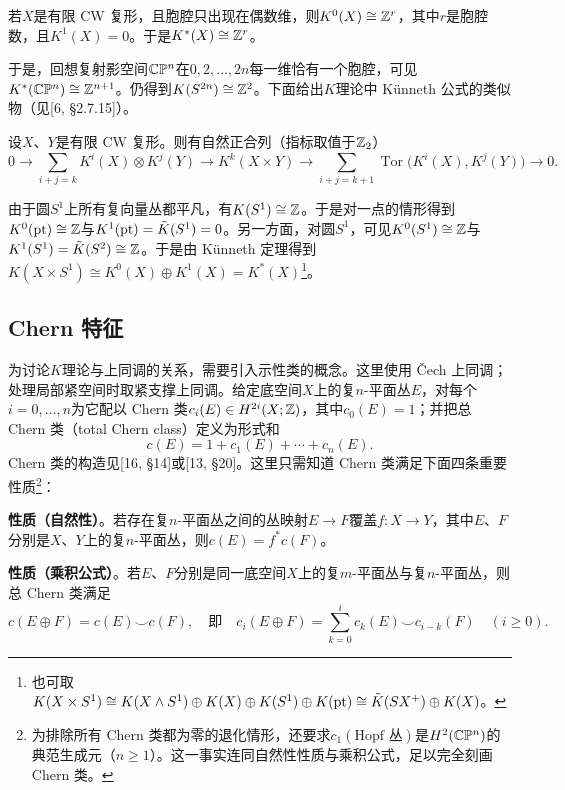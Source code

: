 \begin{proposition}
若$X$是有限 CW 复形，且胞腔只出现在偶数维，则$K^0(X)\cong\mathbb{Z}^r$，其中$r$是胞腔数，且$K^1(X)=0$。于是$K^*(X)\cong\mathbb{Z}^r$。
\end{proposition}

于是，回想复射影空间$\mathbb{C}\mathbb{P}^n$在$0,2,\ldots,2n$每一维恰有一个胞腔，可见$K^*(\mathbb{C}\mathbb{P}^n)\cong\mathbb{Z}^{n+1}$。仍得到$K(S^{2n})\cong\mathbb{Z}^2$。下面给出$K$理论中 K\"unneth 公式的类似物（见[6, §2.7.15]）。

\begin{theorem}[K\"unneth 定理]
设$X$、$Y$是有限 CW 复形。则有自然正合列（指标取值于$\mathbb{Z}_2$）
\[
0\to\sum_{i+j=k}K^i(X)\otimes K^j(Y)\to K^k(X\times Y)\to\sum_{i+j=k+1}\operatorname{Tor}\big(K^i(X),K^j(Y)\big)\to 0.
\]
\end{theorem}

\begin{example}
由于圆$S^1$上所有复向量丛都平凡，有$K(S^1)\cong\mathbb{Z}$。于是对一点的情形得到$K^0(\mathrm{pt})\cong\mathbb{Z}$与$K^1(\mathrm{pt})=\tilde K(S^1)=0$。另一方面，对圆$S^1$，可见$K^0(S^1)\cong\mathbb{Z}$与$K^1(S^1)=\tilde K(S^2)\cong\mathbb{Z}$。于是由 K\"unneth 定理得到$K(X\times S^1)\cong K^0(X)\oplus K^1(X)=K^*(X)$\footnote{也可取$K(X\times S^1)\cong K(X\wedge S^1)\oplus K(X)\oplus K(S^1)\oplus K(\mathrm{pt})\cong\tilde K(SX^+)\oplus K(X)$。}。
\end{example}

\subsection{Chern 特征}
为讨论$K$理论与上同调的关系，需要引入示性类的概念。这里使用 \v{C}ech 上同调；处理局部紧空间时取紧支撑上同调。给定底空间$X$上的复$n$-平面丛$E$，对每个$i=0,\ldots,n$为它配以 Chern 类$c_i(E)\in H^{2i}(X;\mathbb{Z})$，其中$c_0(E)=1$；并把总 Chern 类（total Chern class）定义为形式和
\[
c(E)=1+c_1(E)+\cdots+c_n(E).
\]
Chern 类的构造见[16, §14]或[13, §20]。这里只需知道 Chern 类满足下面四条重要性质\footnote{为排除所有 Chern 类都为零的退化情形，还要求$c_1(\text{Hopf 丛})$是$H^2(\mathbb{C}\mathbb{P}^n)$的典范生成元（$n\ge 1$）。这一事实连同自然性性质与乘积公式，足以完全刻画 Chern 类。}：

\noindent\textbf{性质（自然性）}。若存在复$n$-平面丛之间的丛映射$E\to F$覆盖$f:X\to Y$，其中$E$、$F$分别是$X$、$Y$上的复$n$-平面丛，则$c(E)=f^*c(F)$。

\noindent\textbf{性质（乘积公式）}。若$E$、$F$分别是同一底空间$X$上的复$m$-平面丛与复$n$-平面丛，则总 Chern 类满足
\[
c(E\oplus F)=c(E)\smile c(F),\quad\text{即}\quad c_i(E\oplus F)=\sum_{k=0}^{i}c_k(E)\smile c_{i-k}(F)\quad(i\ge 0).
\]

